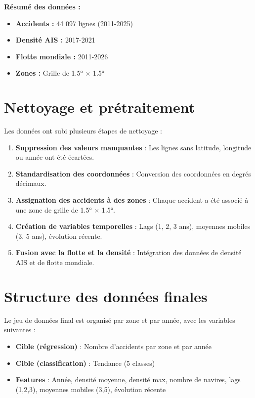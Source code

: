 \documentclass[12pt, a4paper]{report}
\begin{document}
\begin{tcolorbox}[colback=gray!5, colframe=black!50, sharp corners]
\textbf{Résumé des données :}
\begin{itemize}
    \item \textbf{Accidents :} 44 097 lignes (2011-2025)
    \item \textbf{Densité AIS :} 2017-2021
    \item \textbf{Flotte mondiale :} 2011-2026
    \item \textbf{Zones :} Grille de 1.5° × 1.5°
\end{itemize}
\end{tcolorbox}

\section{Nettoyage et prétraitement}

Les données ont subi plusieurs étapes de nettoyage :

\begin{enumerate}
    \item \textbf{Suppression des valeurs manquantes} : Les lignes sans latitude, longitude ou année ont été écartées.
    \item \textbf{Standardisation des coordonnées} : Conversion des coordonnées en degrés décimaux.
    \item \textbf{Assignation des accidents à des zones} : Chaque accident a été associé à une zone de grille de 1.5° × 1.5°.
    \item \textbf{Création de variables temporelles} : Lags (1, 2, 3 ans), moyennes mobiles (3, 5 ans), évolution récente.
    \item \textbf{Fusion avec la flotte et la densité} : Intégration des données de densité AIS et de flotte mondiale.
\end{enumerate}

\section{Structure des données finales}

Le jeu de données final est organisé par zone et par année, avec les variables suivantes :

\begin{itemize}
    \item \textbf{Cible (régression)} : Nombre d'accidents par zone et par année
    \item \textbf{Cible (classification)} : Tendance (5 classes)
    \item \textbf{Features} : Année, densité moyenne, densité max, nombre de navires, lags (1,2,3), moyennes mobiles (3,5), évolution récente
\end{itemize}
\end{document}
